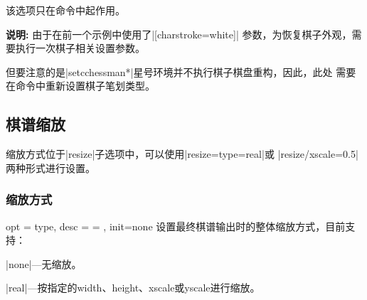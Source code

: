 \documentclass[full]{l3doc}
\begin{document}
\begin{documentation}
  该选项只在命令中起作用。

  \textbf{\textsf{说明: }}由于在前一个示例中使用了|[charstroke=white]|%
  参数，为恢复棋子外观，需要执行一次棋子相关设置参数。

  但要注意的是|setcchessman*|星号环境并不执行棋子棋盘重构，因此，此处
  需要在命令中重新设置棋子笔划类型。

\begin{SideBySideExample}[frame=single,numbers=left,
                xrightmargin=.45\linewidth,gobble=2]
  \centering
    \begin{setcchessman*}[man/label=test]
       
       
       
       
    \end{setcchessman*}
    \begin{flushleft}
      \small
    \end{flushleft}
\end{SideBySideExample}

\subsection{棋谱缩放}

缩放方式位于|resize|子选项中，可以使用|resize={type=real}|或
|resize/xscale=0.5|两种形式进行设置。

\subsubsection{缩放方式}

\begin{option}{ opt = type, desc = {= }, init=none }
  设置最终棋谱输出时的整体缩放方式，目前支持：
\end{option}

  \begin{Description}[a]
    \item |none|---无缩放。
    \item |real|---按指定的width、height、xscale或yscale进行缩放。
  \end{Description}


\end{documentation}
\end{document}
